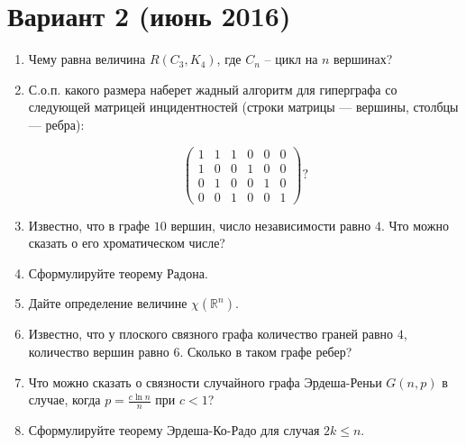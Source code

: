 \documentclass[oneside]{book}
\begin{document}
\section{Вариант 2 (июнь 2016)}
\begin{enumerate}
\item Чему равна величина $R(C_3, K_4)$, где $C_n$ -- цикл на $n$ вершинах?
\item С.о.п. какого размера наберет жадный алгоритм для гиперграфа со следующей матрицей инцидентностей (строки матрицы --- вершины, столбцы --- ребра):

$$\begin{pmatrix} 1 & 1 & 1 & 0 & 0 & 0 \\ 1 & 0 & 0 & 1 & 0 & 0 \\ 0 & 1 & 0 & 0 & 1 & 0 \\0 & 0 & 1 & 0 & 0 & 1 \end{pmatrix}?
$$
\item Известно, что в графе $10$ вершин, число независимости равно $4$. Что можно сказать о его хроматическом числе? 
\item Сформулируйте теорему Радона.
\item Дайте определение величине $\chi(\mathbb{R}^n)$.
\item Известно, что у плоского связного графа количество граней равно $4$, количество вершин равно $6$. Сколько в таком графе ребер?
\item Что можно сказать о связности случайного графа Эрдеша-Реньи $G(n, p)$  в случае, когда $\displaystyle p = \frac{c \ln n}{n}$ при $c < 1$?
\item Сформулируйте теорему Эрдеша-Ко-Радо для случая $2k \leqslant n$. 
\end{enumerate}
\end{document}
